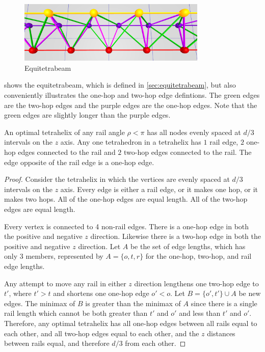 \documentclass[review]{siamonline1116}
\begin{document}
\begin{figure}[H]
     \centering
     \includegraphics[width=0.8\textwidth]{figures/EquitetrabeamCloseUp.png}
     \caption{Equitetrabeam}
  \label{equitetrabeam}
\end{figure}

 shows the equitetrabeam, which is defined in \cref{sec:equitetrabeam},
but also conveniently illustrates the one-hop and two-hop edge defintions.
The green edges are the two-hop edges and the purple edges are the one-hop edges. Note that the green
edges are slightly longer than the purple edges.


\begin{theorem}
  \label{eventhirds}
  An optimal tetrahelix of any rail angle $\rho < \pi$ has all nodes evenly spaced at $d/3$ intervals on the $z$ axis.
  Any one tetrahedron in a tetrahelix has $1$ rail edge, $2$ one-hop edges connected to the rail and $2$ two-hop edges connected to the rail.
  The edge opposite of the rail edge is a one-hop edge.
\end{theorem}

\begin{proof}
    Consider the tetrahelix in which the vertices are evenly spaced at
    $d/3$ intervals on the $z$ axis. Every edge is either a rail edge,
    or it makes one hop, or it makes two hops. All of the one-hop
    edges are equal length.  All of the two-hop edges are equal
    length.

    Every vertex is connected to 4 non-rail edges. There is a one-hop edge
    in both the positive and negative $z$ direction. Likewise there is a two-hop
    edge in both the positive and negative $z$ direction. Let $A$ be the set
    of edge lengths, which has only 3 members, represented by $A = \{o,t,r\}$ for
    the one-hop, two-hop, and rail edge lengths.

    Any attempt to move any rail in either $z$ direction lengthens one two-hop edge to $t'$, where $t' > t$
    and shortens one one-hop edge $o' < o$. Let $B = \{o',t' \} \cup A$ be new edges.
    The minimax of $B$ is greater than the minimax of $A$ since there is a single rail length which cannot be both greater
    than $t'$ and $o'$ and less than $t'$ and $o'$.
    Therefore, any optimal tetrahelix has all one-hop edges between all rails equal to each other, and
    all two-hop edges equal to each other, and the $z$ distances between rails equal, and therefore
    $d/3$ from each other.
\end{proof}
\end{document}

